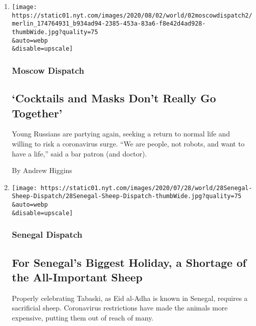\begin{enumerate}
\def\labelenumi{\arabic{enumi}.}
\item
  \href{/2020/08/01/world/europe/russia-moscow-coronavirus.html}{}

  \texttt{[image: https://static01.nyt.com/images/2020/08/02/world/02moscowdispatch2/merlin\_174764931\_b934ad94-2385-453a-83a6-f8e42d4ad928-thumbWide.jpg?quality=75\\\&auto=webp\\\&disable=upscale]}

  \hypertarget{moscow-dispatch}{%
  \subsubsection{Moscow Dispatch}\label{moscow-dispatch}}

  \hypertarget{cocktails-and-masks-dont-really-go-together}{%
  \subsection{`Cocktails and Masks Don't Really Go
  Together'}\label{cocktails-and-masks-dont-really-go-together}}

  Young Russians are partying again, seeking a return to normal life and
  willing to risk a coronavirus surge. ``We are people, not robots, and
  want to have a life,'' said a bar patron (and doctor).

  By Andrew Higgins
\item
  \href{/2020/07/29/world/africa/senegal-tabaski-sheep-eid-adha.html}{}

  \texttt{[image: https://static01.nyt.com/images/2020/07/28/world/28Senegal-Sheep-Dispatch/28Senegal-Sheep-Dispatch-thumbWide.jpg?quality=75\\\&auto=webp\\\&disable=upscale]}

  \hypertarget{senegal-dispatch}{%
  \subsubsection{Senegal Dispatch}\label{senegal-dispatch}}

  \hypertarget{for-senegals-biggest-holiday-a-shortage-of-the-all-important-sheep}{%
  \subsection{For Senegal's Biggest Holiday, a Shortage of the
  All-Important
  Sheep}\label{for-senegals-biggest-holiday-a-shortage-of-the-all-important-sheep}}

  Properly celebrating Tabaski, as Eid al-Adha is known in Senegal,
  requires a sacrificial sheep. Coronavirus restrictions have made the
  animals more expensive, putting them out of reach of many.


\end{enumerate}
